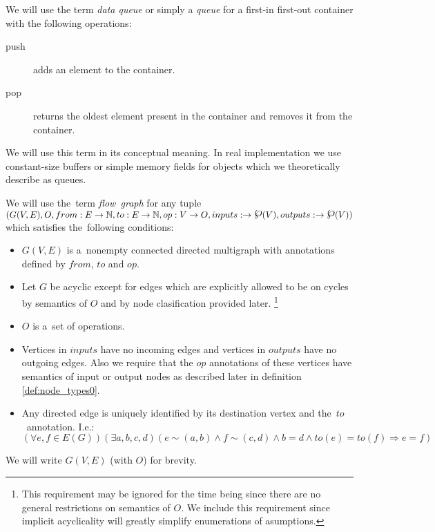 \begin{define}
  We will use the term \emph{data queue} or simply a \emph{queue} for a first-in first-out container with the following operations:
  \begin{description}
  \item[push] adds an element to the container.
  \item[pop] returns the oldest element present in the container and removes it from the container.
  \end{description}
  We will use this term in its conceptual meaning. In real implementation we use constant-size buffers or simple memory fields for objects which we theoretically describe as queues.
\end{define}


\begin{define}
  We will use the~term \emph{flow~graph} for any tuple $(G(V,E),O,from:E \arrow \N, to:E \arrow \N, op:V \arrow O, inputs: \arrow \powerset(V), outputs: \arrow \powerset(V) )$ which satisfies the~following conditions:
\begin{itemize}
  \item $G(V,E)$ is a~nonempty connected directed multigraph with annotations defined by $from$, $to$ and $op$.  
  \item Let $G$ be acyclic except for edges which are explicitly allowed to be on cycles by semantics of $O$ and by node clasification provided later. \footnote{This requirement may be ignored for the time being since there are no general restrictions on semantics of $O$. We include this requirement since implicit acyclicality will greatly simplify enumerations of asumptions.}
  \item $O$ is a~set of operations.
  \item Vertices in $inputs$ have no incoming edges and vertices in $outputs$ have no outgoing edges. Also we require that the $op$ annotations of these vertices have semantics of input or output nodes as described later in definition \ref{def:node_types0}.
  \item Any directed edge is uniquely identified by its destination vertex and the~$to$~annotation. I.e.:
    $$ (\forall{e,f \in E(G)})(\exists a,b,c,d)(e \sim (a,b) \land f \sim (c,d) \land b = d \land to(e) = to(f) \Rightarrow e = f )$$
\end {itemize}
    We will write $G(V,E)$ (with $O$) for brevity.
\end{define}

